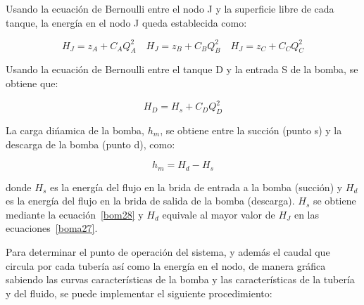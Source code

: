 \documentclass[11pt, oneside]{article}
\begin{document}
Usando la ecuaci\'on de Bernoulli entre el nodo J y la superficie libre de cada tanque, la energ\'ia en el nodo J queda establecida como:

\begin{equation}
H_J = z_A + C_A Q_A^2 \quad H_J = z_B + C_B Q_B^2 \quad H_J = z_C + C_C Q_C^2
\label{boma27}
\end{equation}

Usando la ecuaci\'on de Bernoulli entre el tanque D y la entrada S de la bomba, se obtiene que:

\begin{equation}
H_D = H_s + C_D Q_D^2 
\label{boma28}
\end{equation}

La carga di\'namica de la bomba, $h_m$, se obtiene entre la succi\'on (punto s) y la descarga de la bomba (punto d), como:

\begin{equation}
h_m = H_d-H_s
\label{boma29}
\end{equation}

donde $H_s$ es la energ\'ia del flujo en la brida de entrada a la bomba (succi\'on) y $H_d$ es la energ\'ia del flujo en la brida de salida de la bomba (descarga). $H_s$ se obtiene mediante la ecuaci\'on~\ref{bom28} y $H_d$ equivale al mayor valor de $H_J$ en las ecuaciones~\ref{boma27}.

Para determinar el punto de operaci\'on del sistema, y adem\'as el caudal que circula por cada tuber\'ia as\'i como la energ\'ia en el nodo, de manera gr\'afica sabiendo las curvas caracter\'isticas de la bomba y las caracter\'isticas de la tuber\'ia y del fluido, se puede implementar el siguiente procedimiento:
\end{document}
